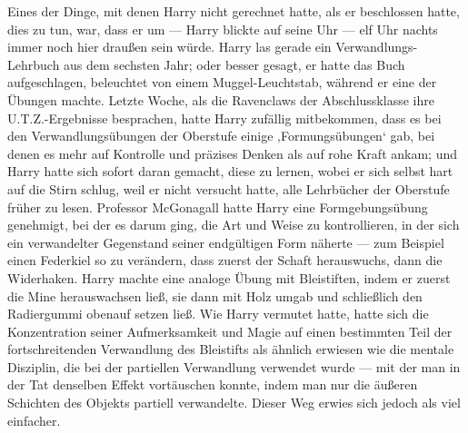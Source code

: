 Eines der Dinge, mit denen Harry nicht gerechnet hatte, als er beschlossen hatte, dies zu tun, war, dass er um — Harry blickte auf seine Uhr — elf Uhr nachts immer noch hier draußen sein würde. Harry las gerade ein Verwandlungs-Lehrbuch aus dem sechsten Jahr; oder besser gesagt, er hatte das Buch aufgeschlagen, beleuchtet von einem Muggel-Leuchtstab, während er eine der Übungen machte. Letzte Woche, als die Ravenclaws der Abschlussklasse ihre U.T.Z.-Ergebnisse besprachen, hatte Harry zufällig mitbekommen, dass es bei den Verwandlungsübungen der Oberstufe einige ‚Formungsübungen‘ gab, bei denen es mehr auf Kontrolle und präzises Denken als auf rohe Kraft ankam; und Harry hatte sich sofort daran gemacht, diese zu lernen, wobei er sich selbst hart auf die Stirn schlug, weil er nicht versucht hatte, alle Lehrbücher der Oberstufe früher zu lesen. Professor McGonagall hatte Harry eine Formgebungsübung genehmigt, bei der es darum ging, die Art und Weise zu kontrollieren, in der sich ein verwandelter Gegenstand seiner endgültigen Form näherte — zum Beispiel einen Federkiel so zu verändern, dass zuerst der Schaft herauswuchs, dann die Widerhaken. Harry machte eine analoge Übung mit Bleistiften, indem er zuerst die Mine herauswachsen ließ, sie dann mit Holz umgab und schließlich den Radiergummi obenauf setzen ließ. Wie Harry vermutet hatte, hatte sich die Konzentration seiner Aufmerksamkeit und Magie auf einen bestimmten Teil der fortschreitenden Verwandlung des Bleistifts als ähnlich erwiesen wie die mentale Disziplin, die bei der partiellen Verwandlung verwendet wurde — mit der man in der Tat denselben Effekt vortäuschen konnte, indem man nur die äußeren Schichten des Objekts partiell verwandelte. Dieser Weg erwies sich jedoch als viel einfacher.

